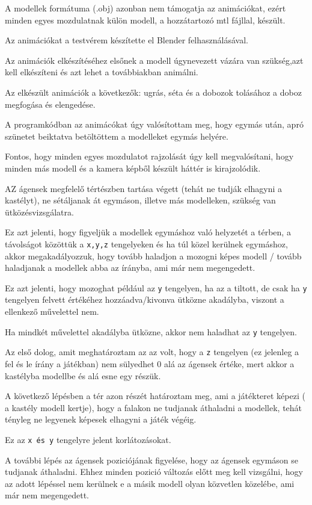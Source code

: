 A modellek formátuma (.obj) azonban nem támogatja az animációkat, ezért minden egyes mozdulatnak külön modell, a hozzátartozó mtl fájllal, készült.

Az animációkat a testvérem készítette el Blender felhasználásával. 

Az animációk elkészítéséhez elsőnek a modell úgynevezett vázára van szükség,azt kell elkészíteni és azt lehet a továbbiakban animálni. 
 
Az elkészült animációk a következők: ugrás, séta és a dobozok tolásához a doboz megfogása és elengedése.
 
A programkódban az animácókat úgy valósítottam meg, hogy egymás után, apró szünetet beiktatva betöltöttem a modelleket egymás helyére.

Fontos, hogy minden egyes mozdulatot rajzolását úgy kell megvalósítani, hogy minden más modell és a kamera képből készült háttér is kirajzolódik.
 

AZ ágensek megfelelő tértészben tartása végett (tehát ne tudják elhagyni a kastélyt), ne sétáljanak át egymáson, illetve más modelleken, szükség van ütközésvizsgálatra.

Ez azt jelenti, hogy figyeljük a modellek egymáshoz való helyzetét a térben, a távolságot közöttük a \texttt{x,y,z} tengelyeken és ha túl közel kerülnek egymáshoz, akkor megakadályozzuk, hogy tovább haladjon a mozogni képes modell / tovább haladjanak a modellek abba az írányba, ami már nem megengedett.

Ez azt jelenti, hogy  mozoghat  például az \texttt{y} tengelyen, ha az a tiltott, de csak ha \texttt{y} tengelyen felvett értékéhez hozzáadva/kivonva ütközne akadályba, viszont a ellenkező művelettel nem. 

Ha mindkét művelettel akadályba ütközne, akkor nem haladhat az \texttt{y} tengelyen.
 
Az első dolog, amit meghatároztam az az volt, hogy a \texttt{z} tengelyen (ez jelenleg a fel és le írány a játékban) nem sülyedhet 0 alá az ágensek értéke, mert akkor a kastélyba modellbe és alá esne egy részük.

A következő lépésben a tér azon részét határoztam meg, ami a játékteret képezi ( a kastély modell kertje), hogy a falakon ne tudjanak áthaladni a modellek, tehát tényleg ne legyenek képesek elhagyni a játék végéig.

Ez az \texttt{x és y} tengelyre jelent korlátozásokat.

A további lépés az ágensek poziciójának figyelése, hogy az ágensek egymáson se tudjanak áthaladni. Ehhez minden pozició változás előtt meg kell vizsgálni, hogy az adott lépéssel nem kerülnek e a másik modell olyan közvetlen közelébe, ami már nem megengedett.

